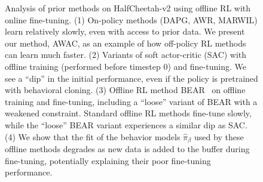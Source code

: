 \begin{figure}[t]
    \caption{
    Analysis of prior methods on HalfCheetah-v2 using offline RL with online fine-tuning. (1) On-policy methods (DAPG, AWR, MARWIL) 
    learn relatively slowly, even with access to prior data. We present our method, AWAC, as an example of how off-policy RL methods can learn much faster. (2) Variants of soft actor-critic (SAC) with offline training (performed before timestep 0) and fine-tuning. We see a ``dip'' in the initial performance, even if the policy is pretrained with behavioral cloning.
    (3) Offline RL method BEAR~\citep{kumar19bear} on offline training and fine-tuning, including a ``loose'' variant of BEAR with a weakened constraint. Standard offline RL methods fine-tune slowly, while the ``loose'' BEAR variant experiences a similar dip as SAC. (4) We show that the fit of the behavior models $\hat{\pi}_\beta$ used by these offline methods
    degrades as new data is added to the buffer during fine-tuning, potentially explaining their poor fine-tuning performance.
    \vspace{-0.2in}
    }
    \label{fig:challenges}
\end{figure}